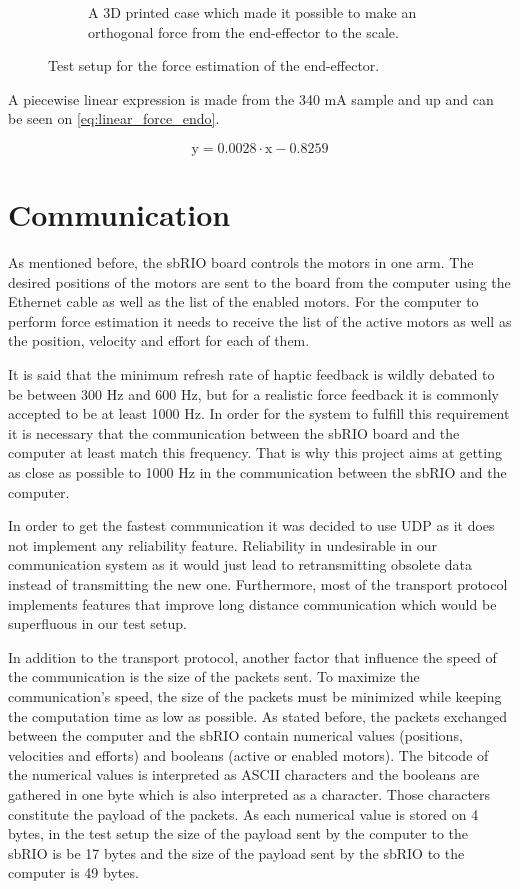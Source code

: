 \documentclass[conference]{IEEEtran}
\begin{document}
\begin{figure}
\begin{subfigure}{.45\linewidth}
		\caption{A 3D printed case which made it possible to make an orthogonal force from the end-effector to the scale.}
		\label{fig:endeffector_force}
	\end{subfigure}
\caption{Test setup for the force estimation of the end-effector.}
\label{fig:Overview_force}
\end{figure}

A piecewise linear expression is made from the 340 mA sample and up and can be seen on \eqref{eq:linear_force_endo}.

\begin{equation}
\text{y} = 0.0028 \cdot \text{x} -0.8259 
\label{eq:linear_force_endo}
\end{equation} 
\section{Communication}

As mentioned before, the sbRIO board controls the motors in one arm. The desired positions of the motors are sent to the board from the computer using the Ethernet cable as well as the list of the enabled motors. For the computer to perform force estimation it needs to receive the list of the active motors as well as the position, velocity and effort for each of them.

It is said that the minimum refresh rate of haptic feedback is wildly debated to
be between 300 Hz and 600 Hz, but for a realistic force feedback it is commonly accepted
to be at least 1000 Hz\cite{coles2011role}. In order for the system to fulfill this requirement it is necessary that the communication between the sbRIO board and the computer at least match this frequency. That is why this project aims at getting as close as possible to 1000 Hz in the communication between the sbRIO and the computer.

In order to get the fastest communication it was decided to use UDP as it does not implement any reliability feature. Reliability in undesirable in our communication system as it would just lead to retransmitting obsolete data instead of transmitting the new one. Furthermore, most of the transport protocol implements features that improve long distance communication which would be superfluous in our test setup. 
 
In addition to the transport protocol, another factor that influence the speed of the communication is the size of the packets sent. To maximize the communication's speed, the size of the packets must be minimized while keeping the computation time as low as possible. As stated before, the packets exchanged between the computer and the sbRIO contain numerical values (positions, velocities and efforts) and booleans (active or enabled motors). The bitcode of the numerical values is interpreted as ASCII characters and the booleans are gathered in one byte which is also interpreted as a character. Those characters constitute the payload of the packets. As each numerical value is stored on 4 bytes, in the test setup the size of the payload sent by the computer to the sbRIO is be 17 bytes and the size of the payload sent by the sbRIO to the computer is 49 bytes.
\end{document}
